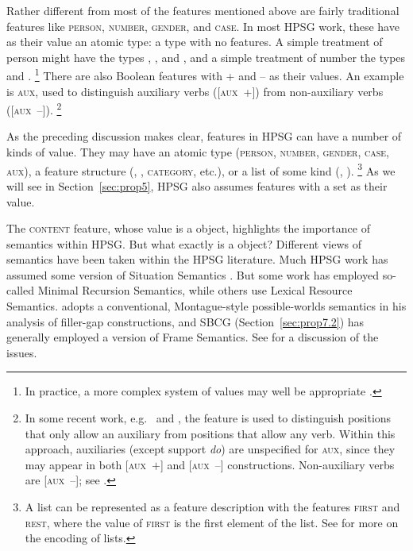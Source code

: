 \documentclass[output=paper
	        ,collection
	        ,collectionchapter
 	        ,biblatex
                ,babelshorthands
                ,newtxmath
                ,draftmode
                ,colorlinks, citecolor=brown
]{langscibook}
\begin{document}
Rather different from most of the features mentioned above are fairly traditional features like \textsc{person, number, gender}, and \textsc{case}. In most HPSG work, these have as their value an atomic type: a type with no features. A simple treatment of person might have the types , , and , and a simple treatment of number the types  and .%
%
\footnote{In practice, a more complex system of values may well be appropriate \citep[Section~3]{Flickinger2000a}.}
%
There are also Boolean features with + and – as their values. An example is \textsc{aux}, used to distinguish auxiliary verbs ([\textsc{aux}~+]) from non-auxiliary verbs ([\textsc{aux}~–]).%
%
\footnote{In some recent work, e.g.\ \citet[157--162]{Sag2012a} and \citet{Sag2020a}, the feature is used to distinguish positions that only allow an auxiliary from positions that allow any verb. Within this approach, auxiliaries (except support \emph{do}) are unspecified for \textsc{aux}, since they may appear in both [\textsc{aux}~$+$] and [\textsc{aux}~$–$] constructions. Non-auxiliary verbs are [\textsc{aux}~$–$]; see .}
%

As the preceding discussion makes clear, features in HPSG can have a number of kinds of value. They may have an atomic type (\textsc{person}, \textsc{number}, \textsc{gender}, \textsc{case}, \textsc{aux}), a feature structure (\synsem, \local, \textsc{category}, etc.), or a list of some kind (\subj, \comps).%
%
\footnote{A list can be represented as a feature description with the features \textsc{first} and \textsc{rest}, where the value of \textsc{first} is the first element of the list. See \crossrefchapterw[\page \pageref{page-list-encoding}]{formal-background} for more on the encoding of lists.}
%
As we will see in Section~\ref{sec:prop5}, HPSG also assumes features with a set as their value.

{\sloppypar
The \textsc{content} feature, whose value is a  object, highlights the importance of
semantics within HPSG. But what exactly is a  object? Different views of semantics
have been taken within the HPSG literature. Much HPSG work has assumed some version of Situation
Semantics \citep{BP83a}. But some work has employed so-called Minimal
Recursion Semantics\indexmrs \citep*{CFPS2005a}, while others use Lexical Resource
Semantics\indexlrs \citep{RS2004a-u}. \citet[501]{Sag2010b} adopts a
conventional, Montague-style possible-worlds semantics \citep{Montague74a-ed} in his analysis of
 filler-gap constructions, and SBCG (Section~\ref{sec:prop7.2}) has generally employed a
version of Frame Semantics. See  for a discussion of the issues.
}
\end{document}
